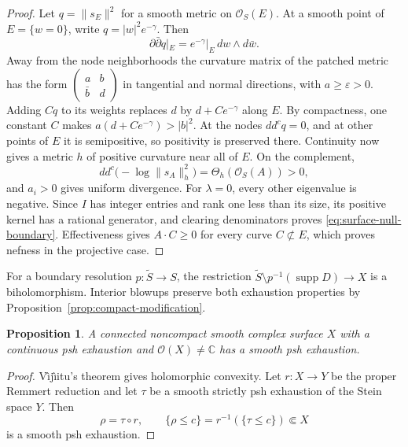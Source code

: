 \documentclass[11pt]{amsart}
\newtheorem{proposition}[theorem]{Proposition}
\theoremstyle{definition}
\theoremstyle{remark}
\numberwithin{equation}{section}
\newcommand{\C}{\mathbb C}
\newcommand{\OO}{\mathcal O}
\newcommand{\ddc}{dd^c}
\newcommand{\barp}{\bar\partial}
\newcommand{\supp}{\operatorname{supp}}
\begin{document}
\begin{proof}
Let $q=\|s_E\|^2$ for a smooth metric on $\OO_S(E)$.
At a smooth point of $E=\{w=0\}$, write $q=|w|^2e^{-\gamma}$.
Then
\[
 \partial\barp q|_E
   =e^{-\gamma}|_E\,dw\wedge d\bar w.
\]
Away from the node neighborhoods the curvature matrix of the
patched metric has the form
$\left(\begin{smallmatrix}a&b\\\bar b&d\end{smallmatrix}\right)$
in tangential and normal directions, with $a\ge\varepsilon>0$.
Adding $Cq$ to its weights replaces $d$ by $d+Ce^{-\gamma}$ along $E$.
By compactness, one constant $C$ makes
$a(d+Ce^{-\gamma})>|b|^2$. At the nodes $\ddc q=0$, and at other
points of $E$ it is semipositive, so positivity is preserved there.
Continuity now gives a metric $h$ of positive curvature near all
of $E$. On the complement,
\[
 \ddc\bigl(-\log\|s_A\|_h^2\bigr)=\Theta_h(\OO_S(A))>0,
\]
and $a_i>0$ gives uniform divergence. For $\lambda=0$, every other
eigenvalue is negative. Since $I$ has integer entries and rank one
less than its size, its positive kernel has a rational generator, and
clearing denominators proves \eqref{eq:surface-null-boundary}.
Effectiveness gives $A\cdot C\ge0$ for every curve $C\not\subset E$,
which proves nefness in the projective case.
\end{proof}

For a boundary resolution $p:\widetilde S\to S$, the restriction
$\widetilde S\setminus p^{-1}(\supp D)\to X$ is a biholomorphism.
Interior blowups preserve both exhaustion properties by
Proposition~\ref{prop:compact-modification}.

\begin{proposition}\label{prop:surface-nonconstant-function}
A connected noncompact smooth complex surface $X$ with a continuous psh
exhaustion and $\OO(X)\ne\C$ has a smooth psh exhaustion.
\end{proposition}
\begin{proof}
V\^{\i}j\^{\i}itu's theorem \cite[Theorem~1.1]{Vajaitu2022} gives
holomorphic convexity. Let $r:X\to Y$ be the proper Remmert
reduction and let $\tau$ be a smooth strictly psh exhaustion of the
Stein space $Y$. Then
\[
 \rho=\tau\circ r,\qquad
 \{\rho\le c\}=r^{-1}(\{\tau\le c\})\Subset X
\]
is a smooth psh exhaustion.
\end{proof}
\end{document}
